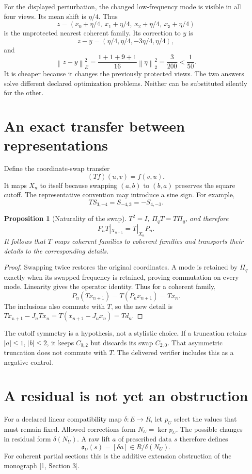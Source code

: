\documentclass[11pt]{article}
\newtheorem{proposition}[theorem]{Proposition}
\theoremstyle{definition}
\theoremstyle{remark}
\newcommand{\norm}[1]{\left\lVert #1\right\rVert}
\begin{document}
For the displayed perturbation, the changed low-frequency mode is visible in all four views. Its mean shift is $\eta/4$. Thus
\[
 z=(x_0+\eta/4,\ x_1+\eta/4,\ x_2+\eta/4,\ x_3+\eta/4)
\]
is the unprotected nearest coherent family. Its correction to $y$ is
\[
 z-y=(\eta/4,\eta/4,-3\eta/4,\eta/4),
\]
and
\[
 \norm{z-y}_E^2=\frac{1+1+9+1}{16}\norm{\eta}_2^2
 =\frac3{200}<\frac1{50}.
\]
It is cheaper because it changes the previously protected views. The two answers solve different declared optimization problems. Neither can be substituted silently for the other.

\section{An exact transfer between representations}
Define the coordinate-swap transfer
\[
 (Tf)(u,v)=f(v,u).
\]
It maps $X_n$ to itself because swapping $(a,b)$ to $(b,a)$ preserves the square cutoff. The representative convention may introduce a sine sign. For example,
\[
 T S_{3,-4}=S_{-4,3}=-S_{4,-3}.
\]
\begin{proposition}[Naturality of the swap]
$T^2=I$, $\Pi_qT=T\Pi_q$, and therefore
\[
 P_nT|_{X_{n+1}}=T|_{X_n}P_n.
\]
It follows that $T$ maps coherent families to coherent families and transports their details to the corresponding details.
\end{proposition}
\begin{proof}
Swapping twice restores the original coordinates. A mode is retained by $\Pi_q$ exactly when its swapped frequency is retained, proving commutation on every mode. Linearity gives the operator identity. Thus for a coherent family,
\[
 P_n(Tx_{n+1})=T(P_nx_{n+1})=Tx_n.
\]
The inclusions also commute with $T$, so the new detail is
$Tx_{n+1}-J_nTx_n=T(x_{n+1}-J_nx_n)=Td_n$.
\end{proof}

The cutoff symmetry is a hypothesis, not a stylistic choice. If a truncation retains $|a|\leq1$, $|b|\leq2$, it keeps $C_{0,2}$ but discards its swap $C_{2,0}$. That asymmetric truncation does not commute with $T$. The delivered verifier includes this as a negative control.

\section{A residual is not yet an obstruction}
\label{sec:obstruction}
For a declared linear compatibility map $\delta:E\to R$, let $p_U$ select the values that must remain fixed. Allowed corrections form $N_U=\ker p_U$. The possible changes in residual form $\delta(N_U)$. A raw lift $a$ of prescribed data $s$ therefore defines
\[
 \mathfrak o_U(s)=[\delta a]\in R/\delta(N_U).
\]
For coherent partial sections this is the additive extension obstruction of the monograph [1, Section 3].
\end{document}
